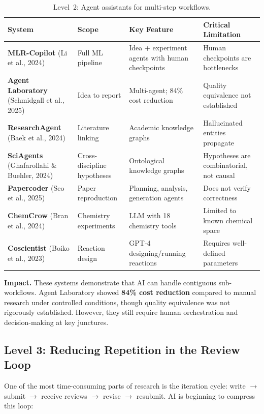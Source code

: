 \documentclass[11pt,a4paper]{article}
\begin{document}
\begin{table}[h]
\centering
\small
\begin{tabular}{@{}p{3cm}p{2.8cm}p{4.2cm}p{4.2cm}@{}}
\toprule
\textbf{System} & \textbf{Scope} & \textbf{Key Feature} & \textbf{Critical Limitation} \\
\midrule
\textbf{MLR-Copilot} (Li et al., 2024) & Full ML pipeline & Idea + experiment agents with human checkpoints & Human checkpoints are bottlenecks \\
\textbf{Agent Laboratory} (Schmidgall et al., 2025) & Idea to report & Multi-agent; 84\% cost reduction & Quality equivalence not established \\
\textbf{ResearchAgent} (Baek et al., 2024) & Literature linking & Academic knowledge graphs & Hallucinated entities propagate \\
\textbf{SciAgents} (Ghafarollahi \& Buehler, 2024) & Cross-discipline hypotheses & Ontological knowledge graphs & Hypotheses are combinatorial, not causal \\
\textbf{Papercoder} (Seo et al., 2025) & Paper reproduction & Planning, analysis, generation agents & Does not verify correctness \\
\textbf{ChemCrow} (Bran et al., 2024) & Chemistry experiments & LLM with 18 chemistry tools & Limited to known chemical space \\
\textbf{Coscientist} (Boiko et al., 2023) & Reaction design & GPT-4 designing/running reactions & Requires well-defined parameters \\
\bottomrule
\end{tabular}
\caption{Level~2: Agent assistants for multi-step workflows.}
\label{tab:level2}
\end{table}

\textbf{Impact.} These systems demonstrate that AI can handle contiguous sub-workflows. Agent Laboratory showed \textbf{84\% cost reduction} compared to manual research under controlled conditions, though quality equivalence was not rigorously established. However, they still require human orchestration and decision-making at key junctures.

\subsection{Level 3: Reducing Repetition in the Review Loop}

One of the most time-consuming parts of research is the iteration cycle: write $\to$ submit $\to$ receive reviews $\to$ revise $\to$ resubmit. AI is beginning to compress this loop:
\end{document}
